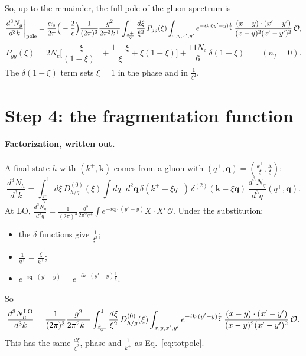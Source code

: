 \documentclass[10pt]{article}
\numberwithin{equation}{section}
\newcommand{\OO}{\mathcal O}
\newcommand{\preLO}{\frac{1}{(2\pi)^3}\frac{g^2}{2\pi^2k^+}}
\newcommand{\XX}{\frac{(x-y)\cdot(x'-y')}{(x-y)^{2}(x'-y')^{2}}}
\newcommand{\ph}{e^{-ik\cdot(y'-y)\frac{1}{\xi}}}
\begin{document}
So, up to the remainder, the full pole of the gluon spectrum is
\begin{equation}
\frac{d^3N_g}{d^3k}\bigg|_{\rm pole}=\frac{\alpha_s}{2\pi}\Big(-\frac{2}{\epsilon}\Big)\preLO\int_{\frac{k^+}{\vee}}^1\frac{d\xi}{\xi^2}\,P_{gg}(\xi)\int_{x,y,x',y'}\ph\,\XX\,\OO ,
\label{eq:totpole}
\end{equation}
\begin{equation}
P_{gg}(\xi)=2N_c\Big[\frac{\xi}{(1-\xi)_+}+\frac{1-\xi}{\xi}+\xi(1-\xi)\Big]+\frac{11N_c}{6}\,\delta(1-\xi)\qquad(n_f=0).
\label{eq:Pgg}
\end{equation}
The $\delta(1-\xi)$ term sets $\xi=1$ in the phase and in $\frac{1}{\xi^2}$.

\section{Step 4: the fragmentation function}\label{sec:FF}
\paragraph{Factorization, written out.} A final state $h$ with $(k^+,\mathbf k)$ comes from a gluon with $(q^+,\mathbf q)=(\frac{k^+}{\xi},\frac{\mathbf k}{\xi})$:
\begin{equation*}
\frac{d^3N_h}{d^3k}=\int_{\frac{k^+}{\vee}}^1d\xi\,D^{(0)}_{h/g}(\xi)\int dq^+d^2\mathbf q\,\delta(k^+-\xi q^+)\,\delta^{(2)}(\mathbf k-\xi\mathbf q)\,\frac{d^3N_g}{d^3q}(q^+,\mathbf q).
\end{equation*}
At LO, $\frac{d^3N_g}{d^3q}=\frac{1}{(2\pi)^3}\frac{g^2}{2\pi^2q^+}\int e^{-i\mathbf q\cdot(y'-y)}X\cdot X'\,\OO$. Under the substitution:
\begin{itemize}
\item the $\delta$ functions give $\frac{1}{\xi^3}$;
\item $\frac{1}{q^+}=\frac{\xi}{k^+}$;
\item $e^{-i\mathbf q\cdot(y'-y)}=\ph$.
\end{itemize}
So
\begin{equation}
\frac{d^3N^{\rm LO}_h}{d^3k}=\preLO\int_{\frac{k^+}{\vee}}^1\frac{d\xi}{\xi^2}\,D^{(0)}_{h/g}(\xi)\int_{x,y,x',y'}\ph\,\XX\,\OO .
\label{eq:LOh}
\end{equation}
This has the same $\frac{d\xi}{\xi^2}$, phase and $\frac{1}{k^+}$ as Eq.~\eqref{eq:totpole}.
\end{document}
